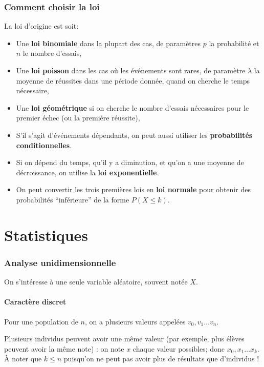 \documentclass[10pt,a4paper,french]{article}
\begin{document}
\section{Comment choisir la loi}

La loi d'origine est soit:

\begin{itemize}
\item Une \textbf{loi binomiale} dans la plupart des cas, de paramètres $p$ la probabilité et $n$ le nombre d'essais,
\item Une \textbf{loi poisson} dans les cas où les événements sont rares, de paramètre $\lambda$ la moyenne de réussites dans une période donnée, quand on cherche le temps nécessaire,
\item Une \textbf{loi géométrique} si on cherche le nombre d'essais nécessaires pour le premier échec (ou la première réussite),
\item S'il s'agit d'événements dépendants, on peut aussi utiliser les \textbf{probabilités conditionnelles}.
\item Si on dépend du temps, qu'il y a diminution, et qu'on a une moyenne de décroissance, on utilise la \textbf{loi exponentielle}.
\item On peut convertir les trois premières lois en \textbf{loi normale} pour obtenir des probabilités ``inférieure'' de la forme $P(X \leq k)$.
\end{itemize}

\part{Statistiques}

\section{Analyse unidimensionnelle}

On s'intéresse à une seule variable aléatoire, souvent notée $X$.

\subsection{Caractère discret}

Pour une population de $n$, on a plusieurs valeurs appelées $v_0, v_1 \ldots v_n$.

Plusieurs individus peuvent avoir une même valeur (par exemple, plus élèves peuvent avoir la même note) : on note $x$ chaque valeur possibles; donc $x_0, x_1 \ldots x_k$. À noter que $k \leq n$ puisqu'on ne peut pas avoir plus de résultats que d'individus !
\end{document}
